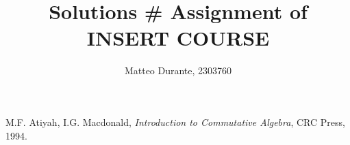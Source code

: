 \documentclass{article}
\begin{document}
\title{Solutions # Assignment of INSERT COURSE}

\author{Matteo Durante, 2303760}


\maketitle

\begin{thebibliography}{9}
	M.F. Atiyah, I.G. Macdonald,
	\textit{Introduction to Commutative Algebra},
	CRC Press,
	1994.
\end{thebibliography}
\end{document}
